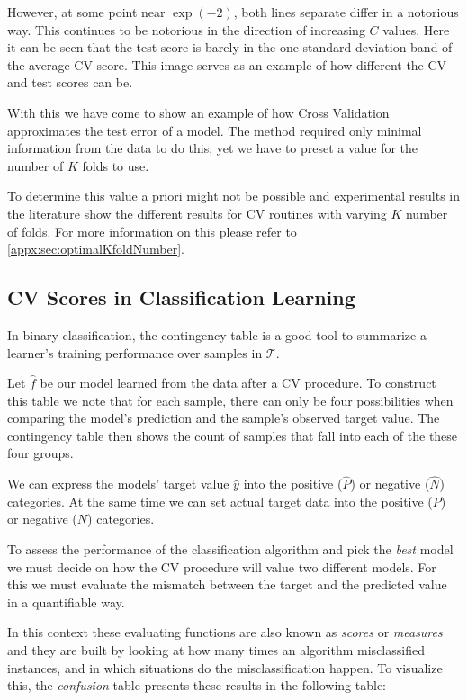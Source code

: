 However, at some point near $\exp(-2)$, both lines separate differ in a notorious way.
This continues to be notorious in the direction of increasing $C$ values.
Here it can be seen that the test score is barely in the one standard deviation band of the average CV score.
This image serves as an example of how different the CV and test scores can be.

With this we have come to show an example of how Cross Validation approximates the test error of a model.
The method required only minimal information from the data to do this, yet we have to preset a value for the number of $K$ folds to use.

To determine this value a priori might not be possible and experimental results in the literature show the different results for CV routines with varying $K$ number of folds.
For more information on this please refer to \cref{appx:sec:optimalKfoldNumber}.


\subsection{CV Scores in Classification Learning}\label{section:scoring_functions}

In binary classification, the contingency table is a good tool to summarize a learner's training performance over samples in $\mathcal{T}$.

Let $\hat{f}$ be our model learned from the data after a CV procedure.
To construct this table we note that for each sample, there can only be four possibilities when comparing the model's prediction and the sample's observed target value.
The contingency table then shows the count of samples that fall into each of the these four groups.

We can express the models' target value $\hat{y}$ into the positive ($\hat{P}$) or negative ($\hat{N}$) categories.
At the same time we can set actual target data into the positive ($P$) or negative ($N$) categories.

To assess the performance of the classification algorithm and pick the \textit{best} model we must decide on how the CV procedure will value two different models.
For this we must evaluate the mismatch between the target and the predicted value in a quantifiable way.

In this context these evaluating functions are also known as \textit{scores} or \textit{measures} and they are built by looking at how many times an algorithm misclassified instances, and in which situations do the misclassification happen.
To visualize this, the \textit{confusion} table presents these results in the following table:

